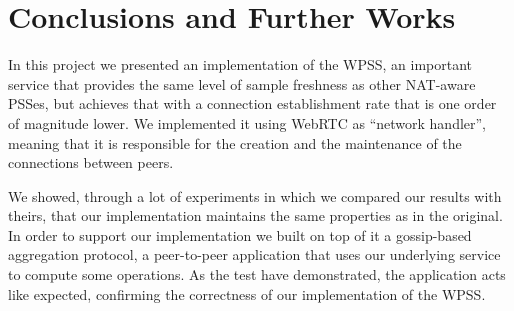 
\chapter{Conclusions and Further Works}
\label{cha:conclusions}
In this project we presented an implementation of the WPSS, an important service that provides the same level of sample freshness as other NAT-aware PSSes, but achieves that with a connection establishment rate that is one order of magnitude lower. We implemented it using WebRTC as ``network handler'', meaning that it is responsible for the creation and the maintenance of the connections between peers.

We showed, through a lot of experiments in which we compared our results with theirs, that our implementation maintains the same properties as in the original. In order to support our implementation we built on top of it a gossip-based aggregation protocol, a peer-to-peer application that uses our underlying service to compute some operations. As the test have demonstrated, the application acts like expected, confirming the correctness of our implementation of the WPSS.